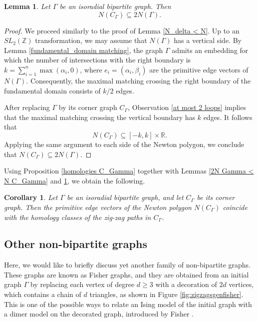 \documentclass[12pt,a4paper]{article}
\newtheorem{cor}[thm]{Corollary}
\newtheorem{lem}[thm]{Lemma}
\theoremstyle{definition}
\begin{document}
\begin{lem} \label{N(C_Gamma) < 2 N(Gamma)}
    Let $\Gamma$ be an isoradial bipartite graph. Then
    \[N(C_{\Gamma}) \subseteq 2 N(\Gamma).\] 
\end{lem}

\begin{proof}
    We proceed similarly to the proof of Lemma \ref{N_delta < N}. Up to an $SL_2(\mathbb{Z})$ transformation, we may assume that $N(\Gamma)$ has a vertical side. By Lemma \ref{fundamental_domain matching}, the graph $\Gamma$ admits an embedding for which the number of intersections with the right boundary is $k = \sum_{i=1}^n \max(\alpha_i,0)$, where $e_i = (\alpha_i, \beta_i)$ are the primitive edge vectors of $N(\Gamma)$. Consequently, the maximal matching crossing the right boundary of the fundamental domain consists of $k/2$ edges.
    
    After replacing $\Gamma$ by its corner graph $C_{\Gamma}$, Observation \ref{at most 2 loops} implies that the maximal matching crossing the vertical boundary has $k$ edges. It follows that \[N(C_{\Gamma}) \subseteq [-k, k] \times \mathbb{R}.\] Applying the same argument to each side of the Newton polygon, we conclude that $N(C_{\Gamma}) \subseteq 2 N(\Gamma)$.
\end{proof}

Using Proposition \ref{homologies C_Gamma} together with Lemmas \ref{2N Gamma < N C_Gamma} and \ref{N(C_Gamma) < 2 N(Gamma)}, we obtain the following.

\begin{cor}
    Let $\Gamma$ be an isoradial bipartite graph, and let $C_\Gamma$ be its corner graph. Then the primitive edge vectors of the Newton polygon $N(C_\Gamma)$ coincide with the homology classes of the zig-zag paths in $C_\Gamma$.
\end{cor}

\subsection{Other non-bipartite graphs}

Here, we would like to briefly discuss yet another family of non-bipartite graphs. These graphs are known as Fisher graphs, and they are obtained from an initial graph $\Gamma$ by replacing each vertex of degree $d \geq 3$ with a decoration of $2d$ vertices, which contains a chain of $d$ triangles, as shown in Figure \ref{fig:zigzagsgenfisher}. This is one of the possible ways to relate an Ising model of the initial graph with a dimer model on the decorated graph, introduced by Fisher \cite{Fisher66}. 
\end{document}
